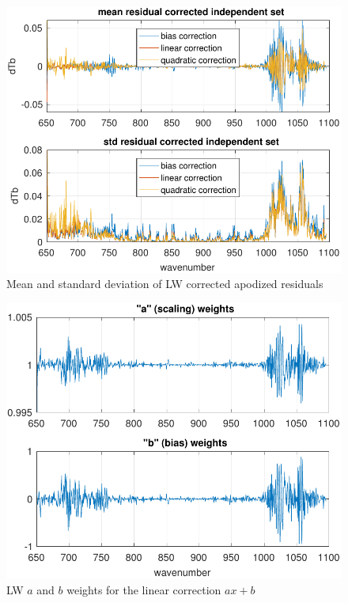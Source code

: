 \documentclass[10pt,twocolumn]{article}  %
\begin{document}
\begin{figure} %
  \centering
  \includegraphics[width=\linewidth]{figures/a2cris_regr_LW.pdf}
  \caption{Mean and standard deviation of LW corrected apodized
    residuals}
  \label{statLW}
\end{figure}

\begin{figure} %
  \centering
  \includegraphics[width=\linewidth]{figures/a2cris_coef_LW.pdf}
  \caption{LW $a$ and $b$ weights for the linear correction $ax+b$}
  \label{coefLW}
\end{figure}
\end{document}
